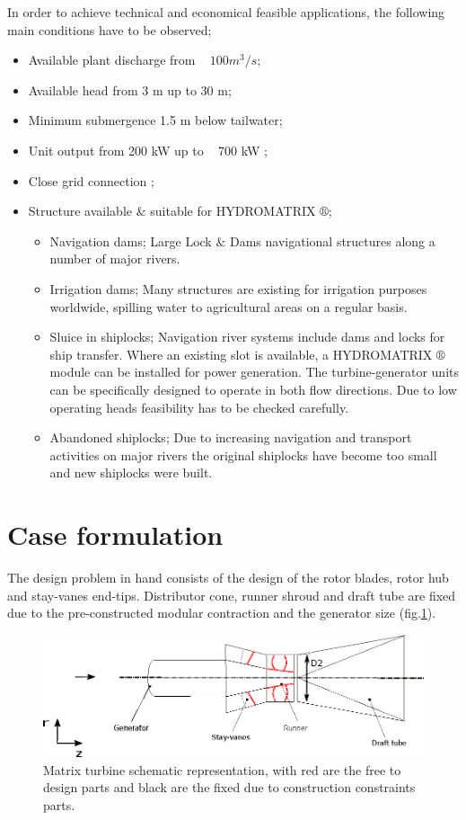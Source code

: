 In order to achieve technical and economical feasible applications, the following main conditions have to be observed; 
\begin{itemize}
\item Available plant discharge from ~ $100 m^3/s$; 
\item Available head from 3 m up to 30 m; 
\item Minimum submergence 1.5 m below tailwater;
\item Unit output from 200 kW up to ~ 700 kW ;
\item Close grid connection ;
\item Structure available $\&$ suitable for HYDROMATRIX $\circledR$; 
\begin{itemize}
	\item Navigation dams; Large Lock $\&$ Dams navigational structures along a number of major rivers. 
	\item Irrigation dams; Many structures are existing for irrigation purposes worldwide, spilling water to agricultural areas on a regular basis.
	\item Sluice in shiplocks; Navigation river systems include dams and locks for ship transfer. Where an existing slot is available, a HYDROMATRIX $\circledR$ module can be installed for power generation. The turbine-generator units can be specifically designed to operate in both flow directions. Due to low operating heads feasibility has to be checked carefully. 
	\item Abandoned shiplocks; Due to increasing navigation and transport activities on major rivers the original shiplocks have become too small and new shiplocks were built.
\end{itemize}
\end{itemize}


\section{Case formulation}
The design problem in hand consists of the design of the rotor blades, rotor hub and stay-vanes end-tips. Distributor cone, runner shroud and draft tube are fixed due to the pre-constructed modular contraction and the generator size (fig.\ref{Matrix_b}).     


\begin{figure}[h!]
\centering
\includegraphics[width=120mm]{gen_turb.eps}    
\caption{Matrix turbine schematic representation, with red are the free to design parts and black are the fixed due to construction constraints parts.  }
\label{Matrix_b}
\end{figure}

